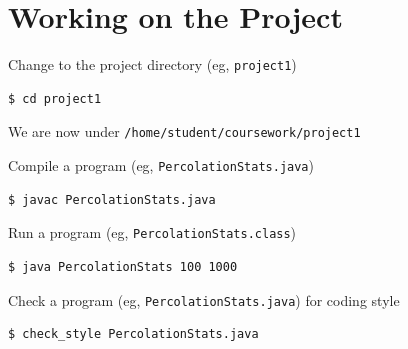 \documentclass[8pt,a4paper,compress]{beamer}
\begin{document}
\section{Working on the Project}
\begin{frame}[fragile]
\pause\transdissolve

Change to the project directory (eg, \lstinline{project1})

\begin{tcolorbox}[enhanced,drop shadow southwest,sharp corners,size=fbox,colback=black]
\begin{lstlisting}[style=terminal]
$ cd project1
\end{lstlisting}
\end{tcolorbox}

\pause\transdissolve\bigskip

We are now under \lstinline{/home/student/coursework/project1}

\pause\transdissolve\bigskip

Compile a program (eg, \lstinline{PercolationStats.java})

\begin{tcolorbox}[enhanced,drop shadow southwest,sharp corners,size=fbox,colback=black]
\begin{lstlisting}[style=terminal]
$ javac PercolationStats.java
\end{lstlisting}
\end{tcolorbox}

\pause\transdissolve\bigskip

Run a program (eg, \lstinline{PercolationStats.class})

\begin{tcolorbox}[enhanced,drop shadow southwest,sharp corners,size=fbox,colback=black]
\begin{lstlisting}[style=terminal]
$ java PercolationStats 100 1000
\end{lstlisting}
\end{tcolorbox}

\pause\transdissolve\bigskip

Check a program (eg, \lstinline{PercolationStats.java}) for coding style

\begin{tcolorbox}[enhanced,drop shadow southwest,sharp corners,size=fbox,colback=black]
\begin{lstlisting}[style=terminal]
$ check_style PercolationStats.java
\end{lstlisting}
\end{tcolorbox}
\end{frame}
\end{document}
